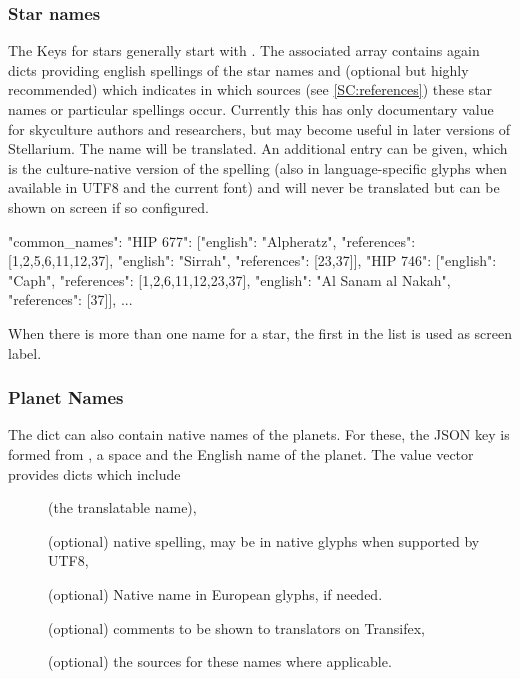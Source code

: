 \subsubsection{Star names}


The Keys for stars generally start with . 
The associated array contains again dicts providing english spellings of the star names 
and  (optional but highly recommended) which indicates 
in which sources (see \ref{SC:references}) these star names or particular spellings occur.
Currently this has only documentary value for skyculture authors and researchers, but may become useful in later versions of Stellarium.
The  name will be translated. An additional  entry can be given, 
which is the culture-native version of the spelling 
(also in language-specific glyphs when available in UTF8 and the current font) and will never be translated but can be shown on screen if so configured.


\begin{jsonfile}[\scriptsize]
"common_names": {
    "HIP 677": [{"english": "Alpheratz", "references": [1,2,5,6,11,12,37]},
                {"english": "Sirrah", "references": [23,37]}],
    "HIP 746": [{"english": "Caph", "references": [1,2,6,11,12,23,37]},
                {"english": "Al Sanam al Nakah", "references": [37]}],
	... }
\end{jsonfile}

When there is more than one name for a star, the first in the list is used as screen label. 


\subsubsection{Planet Names}
\label{sec:skycultures:planetnames}

The   dict can also contain native names of the planets. 
For these, the JSON key is formed from , a space and the English name of the planet. 
The value vector provides dicts which include 
\begin{description}
\item[] (the translatable name), 
\item[] (optional) native spelling, may be in native glyphs when supported by UTF8, 
\item[] (optional) Native name in European glyphs, if needed.
\item[] (optional) comments to be shown to translators on Transifex, 
\item[] (optional) the sources for these names where applicable.
\end{description}

